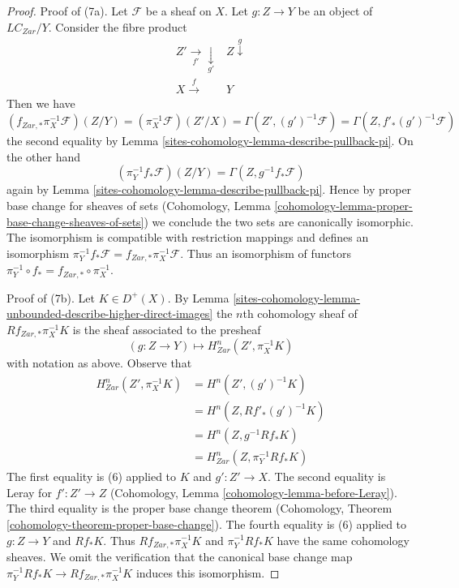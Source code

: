 \begin{proof}
\medskip\noindent
Proof of (7a). Let $\mathcal{F}$ be a sheaf on $X$.
Let $g : Z \to Y$ be an object of $\textit{LC}_{Zar}/Y$. Consider the
fibre product
$$
\begin{array}{cc}Z' \underset{f'}{\longrightarrow}\underset{g'}{\downarrow} & Z \overset{g}{\downarrow} \\ X \overset{f}{\longrightarrow} & Y\end{array}
$$
Then we have
$$
(f_{Zar, *}\pi_X^{-1}\mathcal{F})(Z/Y) =
(\pi_X^{-1}\mathcal{F})(Z'/X)  =
\Gamma(Z', (g')^{-1}\mathcal{F})  =
\Gamma(Z, f'_*(g')^{-1}\mathcal{F})
$$
the second equality by Lemma \ref{sites-cohomology-lemma-describe-pullback-pi}.
On the other hand
$$
(\pi_Y^{-1}f_*\mathcal{F})(Z/Y) = \Gamma(Z, g^{-1}f_*\mathcal{F})
$$
again by Lemma \ref{sites-cohomology-lemma-describe-pullback-pi}.
Hence by proper base change for sheaves of sets
(Cohomology, Lemma \ref{cohomology-lemma-proper-base-change-sheaves-of-sets})
we conclude the two sets are canonically isomorphic.
The isomorphism is compatible with restriction mappings
and defines an isomorphism
$\pi_Y^{-1}f_*\mathcal{F} = f_{Zar, *}\pi_X^{-1}\mathcal{F}$.
Thus an isomorphism of functors
$\pi_Y^{-1} \circ f_* = f_{Zar, *} \circ \pi_X^{-1}$.

\medskip\noindent
Proof of (7b). Let $K \in D^+(X)$. By
Lemma \ref{sites-cohomology-lemma-unbounded-describe-higher-direct-images}
the $n$th cohomology sheaf of
$Rf_{Zar, *}\pi_X^{-1}K$ is the sheaf associated to the presheaf
$$
(g : Z \to Y) \longmapsto H^n_{Zar}(Z', \pi_X^{-1}K)
$$
with notation as above. Observe that
\begin{align*}
H^n_{Zar}(Z', \pi_X^{-1}K)
& =
H^n(Z', (g')^{-1}K) \\
& =
H^n(Z, Rf'_*(g')^{-1}K) \\
& =
H^n(Z, g^{-1}Rf_*K) \\
& =
H^n_{Zar}(Z, \pi_Y^{-1}Rf_*K)
\end{align*}
The first equality is (6) applied to $K$ and $g' : Z' \to X$.
The second equality is Leray for $f' : Z' \to Z$
(Cohomology, Lemma \ref{cohomology-lemma-before-Leray}).
The third equality is the proper base change theorem
(Cohomology, Theorem \ref{cohomology-theorem-proper-base-change}).
The fourth equality is (6) applied to $g : Z \to Y$ and $Rf_*K$.
Thus $Rf_{Zar, *}\pi_X^{-1}K$ and $\pi_Y^{-1}Rf_*K$ have the same
cohomology sheaves. We omit the verification that the
canonical base change map $\pi_Y^{-1}Rf_*K \to Rf_{Zar, *}\pi_X^{-1}K$
induces this isomorphism.
\end{proof}

